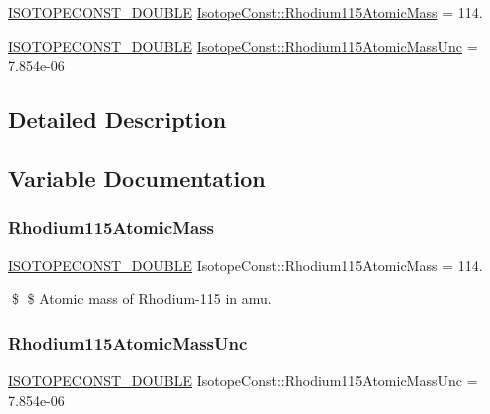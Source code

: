 \begin{DoxyCompactItemize}
\item 
\mbox{\hyperlink{group___isotope_const-_macros_ga8f45a7272ce02c0b4c65c44636ed719a}{I\+S\+O\+T\+O\+P\+E\+C\+O\+N\+S\+T\+\_\+\+D\+O\+U\+B\+LE}} \mbox{\hyperlink{group___isotope_const-_rhodium-_rh115_ga46941618dd666f301a24d7b10e84cf73}{Isotope\+Const\+::\+Rhodium115\+Atomic\+Mass}} = 114.
\item 
\mbox{\hyperlink{group___isotope_const-_macros_ga8f45a7272ce02c0b4c65c44636ed719a}{I\+S\+O\+T\+O\+P\+E\+C\+O\+N\+S\+T\+\_\+\+D\+O\+U\+B\+LE}} \mbox{\hyperlink{group___isotope_const-_rhodium-_rh115_gae296fc006ca8cb14d1a7691021010830}{Isotope\+Const\+::\+Rhodium115\+Atomic\+Mass\+Unc}} = 7.\+854e-\/06
\end{DoxyCompactItemize}


\subsection{Detailed Description}


\subsection{Variable Documentation}
\mbox{\label{group___isotope_const-_rhodium-_rh115_ga46941618dd666f301a24d7b10e84cf73}} 
\subsubsection{\texorpdfstring{Rhodium115\+Atomic\+Mass}{Rhodium115AtomicMass}}
{\footnotesize\ttfamily \mbox{\hyperlink{group___isotope_const-_macros_ga8f45a7272ce02c0b4c65c44636ed719a}{I\+S\+O\+T\+O\+P\+E\+C\+O\+N\+S\+T\+\_\+\+D\+O\+U\+B\+LE}} Isotope\+Const\+::\+Rhodium115\+Atomic\+Mass = 114.}

\$ \$ Atomic mass of Rhodium-\/115 in amu. \mbox{\label{group___isotope_const-_rhodium-_rh115_gae296fc006ca8cb14d1a7691021010830}} 
\subsubsection{\texorpdfstring{Rhodium115\+Atomic\+Mass\+Unc}{Rhodium115AtomicMassUnc}}
{\footnotesize\ttfamily \mbox{\hyperlink{group___isotope_const-_macros_ga8f45a7272ce02c0b4c65c44636ed719a}{I\+S\+O\+T\+O\+P\+E\+C\+O\+N\+S\+T\+\_\+\+D\+O\+U\+B\+LE}} Isotope\+Const\+::\+Rhodium115\+Atomic\+Mass\+Unc = 7.\+854e-\/06}

